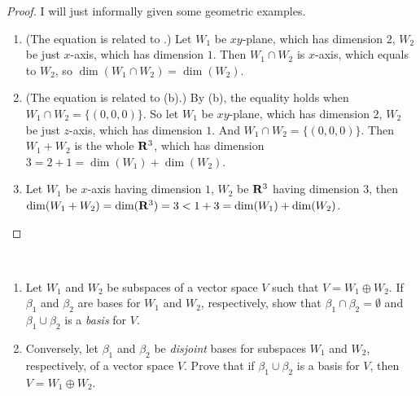 \begin{proof}
I will just informally given some geometric examples.
\begin{enumerate}
\item (The equation is related to .) Let \(W_1\) be \(xy\)-plane, which has dimension \(2\), \(W_2\) be just \(x\)-axis, which has dimension \(1\).
    Then \(W_1 \cap W_2\) is \(x\)-axis, which equals to \(W_2\), so \(\dim(W_1 \cap W_2) = \dim(W_2)\).
\item (The equation is related to (b).) By (b), the equality holds when \(W_1 \cap W_2 = \{ (0, 0, 0) \}\).
    So let \(W_1\) be \(xy\)-plane, which has dimension \(2\), \(W_2\) be just \(z\)-axis, which has dimension \(1\).
    And \(W_1 \cap W_2 = \{ (0, 0, 0) \}\).
    Then \(W_1 + W_2\) is the whole \(\mathbf{R}^3\), which has dimension \(3 = 2 + 1 = \dim(W_1) + \dim(W_2)\).
\item Let \(W_1\) be \(x\)-axis having dimension \(1\), \(W_2\) be \(\mathbf{R}^3\) having dimension \(3\), then \(\dim(W_1 + W_2) = \dim(\mathbf{R}^3) = 3 < 1 + 3 = \dim(W_1) + \dim(W_2)\).
\end{enumerate}
\end{proof}

\begin{exercise} \label{exercise 1.6.33} \ 

\begin{enumerate}
\item Let \(W_1\) and \(W_2\) be subspaces of a vector space \(V\) such that \(V = W_1 \oplus W_2\).
    If \(\beta_1\) and \(\beta_2\) are bases for \(W_1\) and \(W_2\), respectively, show that \(\beta_1 \cap \beta_2 = \emptyset\) and \(\beta_1 \cup \beta_2\) is a \emph{basis} for \(V\).
\item Conversely, let \(\beta_1\) and \(\beta_2\) be \emph{disjoint} bases for subspaces \(W_1\) and \(W_2\), respectively, of a vector space \(V\).
    Prove that if \(\beta_1 \cup \beta_2\) is a basis for \(V\), then \(V = W_1 \oplus W_2\).
\end{enumerate}
\end{exercise}


